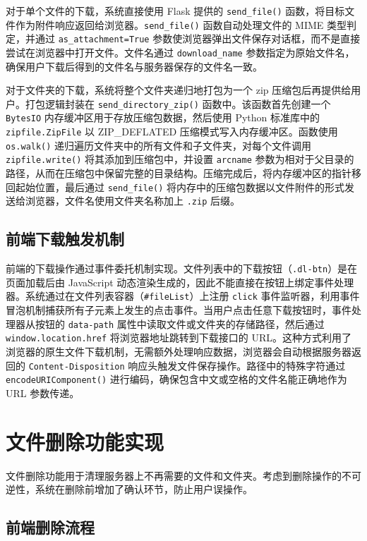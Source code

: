 \documentclass[UTF8,zihao=-4]{ctexrep}
\begin{document}
对于单个文件的下载，系统直接使用 Flask 提供的 \texttt{send\_file()} 函数，将目标文件作为附件响应返回给浏览器。\texttt{send\_file()} 函数自动处理文件的 MIME 类型判定，并通过 \texttt{as\_attachment=True} 参数使浏览器弹出文件保存对话框，而不是直接尝试在浏览器中打开文件。文件名通过 \texttt{download\_name} 参数指定为原始文件名，确保用户下载后得到的文件名与服务器保存的文件名一致。

对于文件夹的下载，系统将整个文件夹递归地打包为一个 zip 压缩包后再提供给用户。打包逻辑封装在 \texttt{send\_directory\_zip()} 函数中。该函数首先创建一个 \texttt{BytesIO} 内存缓冲区用于存放压缩包数据，然后使用 Python 标准库中的 \texttt{zipfile.ZipFile} 以 ZIP\_DEFLATED 压缩模式写入内存缓冲区。函数使用 \texttt{os.walk()} 递归遍历文件夹中的所有文件和子文件夹，对每个文件调用 \texttt{zipfile.write()} 将其添加到压缩包中，并设置 \texttt{arcname} 参数为相对于父目录的路径，从而在压缩包中保留完整的目录结构。压缩完成后，将内存缓冲区的指针移回起始位置，最后通过 \texttt{send\_file()} 将内存中的压缩包数据以文件附件的形式发送给浏览器，文件名使用文件夹名称加上 \texttt{.zip} 后缀。

\subsection{前端下载触发机制}

前端的下载操作通过事件委托机制实现。文件列表中的下载按钮（\texttt{.dl-btn}）是在页面加载后由 JavaScript 动态渲染生成的，因此不能直接在按钮上绑定事件处理器。系统通过在文件列表容器（\texttt{\#fileList}）上注册 \texttt{click} 事件监听器，利用事件冒泡机制捕获所有子元素上发生的点击事件。当用户点击任意下载按钮时，事件处理器从按钮的 \texttt{data-path} 属性中读取文件或文件夹的存储路径，然后通过 \texttt{window.location.href} 将浏览器地址跳转到下载接口的 URL。这种方式利用了浏览器的原生文件下载机制，无需额外处理响应数据，浏览器会自动根据服务器返回的 \texttt{Content-Disposition} 响应头触发文件保存操作。路径中的特殊字符通过 \texttt{encodeURIComponent()} 进行编码，确保包含中文或空格的文件名能正确地作为 URL 参数传递。


\section{文件删除功能实现}

文件删除功能用于清理服务器上不再需要的文件和文件夹。考虑到删除操作的不可逆性，系统在删除前增加了确认环节，防止用户误操作。

\subsection{前端删除流程}
\end{document}
